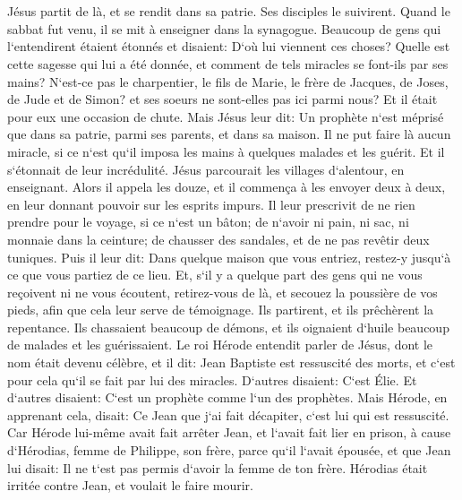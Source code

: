 \chapter{}

\verse Jésus partit de là, et se rendit dans sa patrie. Ses disciples le suivirent. 
\verse Quand le sabbat fut venu, il se mit à enseigner dans la synagogue. Beaucoup de gens qui l`entendirent étaient étonnés et disaient: D`où lui viennent ces choses? Quelle est cette sagesse qui lui a été donnée, et comment de tels miracles se font-ils par ses mains? 
\verse N`est-ce pas le charpentier, le fils de Marie, le frère de Jacques, de Joses, de Jude et de Simon? et ses soeurs ne sont-elles pas ici parmi nous? Et il était pour eux une occasion de chute. 
\verse Mais Jésus leur dit: Un prophète n`est méprisé que dans sa patrie, parmi ses parents, et dans sa maison. 
\verse Il ne put faire là aucun miracle, si ce n`est qu`il imposa les mains à quelques malades et les guérit. 
\verse Et il s`étonnait de leur incrédulité. Jésus parcourait les villages d`alentour, en enseignant. 
\verse Alors il appela les douze, et il commença à les envoyer deux à deux, en leur donnant pouvoir sur les esprits impurs. 
\verse Il leur prescrivit de ne rien prendre pour le voyage, si ce n`est un bâton; de n`avoir ni pain, ni sac, ni monnaie dans la ceinture; 
\verse de chausser des sandales, et de ne pas revêtir deux tuniques. 
\verse Puis il leur dit: Dans quelque maison que vous entriez, restez-y jusqu`à ce que vous partiez de ce lieu. 
\verse Et, s`il y a quelque part des gens qui ne vous reçoivent ni ne vous écoutent, retirez-vous de là, et secouez la poussière de vos pieds, afin que cela leur serve de témoignage. 
\verse Ils partirent, et ils prêchèrent la repentance. 
\verse Ils chassaient beaucoup de démons, et ils oignaient d`huile beaucoup de malades et les guérissaient. 
\verse Le roi Hérode entendit parler de Jésus, dont le nom était devenu célèbre, et il dit: Jean Baptiste est ressuscité des morts, et c`est pour cela qu`il se fait par lui des miracles. 
\verse D`autres disaient: C`est Élie. Et d`autres disaient: C`est un prophète comme l`un des prophètes. 
\verse Mais Hérode, en apprenant cela, disait: Ce Jean que j`ai fait décapiter, c`est lui qui est ressuscité. 
\verse Car Hérode lui-même avait fait arrêter Jean, et l`avait fait lier en prison, à cause d`Hérodias, femme de Philippe, son frère, parce qu`il l`avait épousée, 
\verse et que Jean lui disait: Il ne t`est pas permis d`avoir la femme de ton frère. 
\verse Hérodias était irritée contre Jean, et voulait le faire mourir. 

